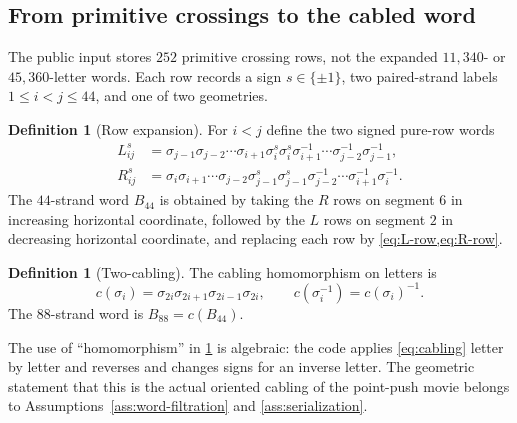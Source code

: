 \documentclass[10pt,reqno]{amsart}
\theoremstyle{definition}
\newtheorem{definition}[theorem]{Definition}
\theoremstyle{remark}
\begin{document}
\subsection{From primitive crossings to the cabled word}

The public input stores $252$ primitive crossing rows, not the expanded
$11{,}340$- or $45{,}360$-letter words.  Each row records a sign
$s\in\{\pm1\}$, two paired-strand labels $1\le i<j\le44$, and one of two geometries.

\begin{definition}[Row expansion]\label{def:row-expansion}
For $i<j$ define the two signed pure-row words
\begin{align}
L_{ij}^{s}
 &=\sigma_{j-1}\sigma_{j-2}\cdots\sigma_{i+1}
   \sigma_i^{s}\sigma_i^{s}
   \sigma_{i+1}^{-1}\cdots\sigma_{j-2}^{-1}\sigma_{j-1}^{-1},
   \label{eq:L-row}\\
R_{ij}^{s}
 &=\sigma_i\sigma_{i+1}\cdots\sigma_{j-2}
   \sigma_{j-1}^{s}\sigma_{j-1}^{s}
   \sigma_{j-2}^{-1}\cdots\sigma_{i+1}^{-1}\sigma_i^{-1}.
   \label{eq:R-row}
\end{align}
The $44$-strand word $B_{44}$ is obtained by taking the $R$ rows on segment
$6$ in increasing horizontal coordinate, followed by the $L$ rows on segment
$2$ in decreasing horizontal coordinate, and replacing each row by
\cref{eq:L-row,eq:R-row}.
\end{definition}

\begin{definition}[Two-cabling]\label{def:cabling}
The cabling homomorphism on letters is
\begin{equation}\label{eq:cabling}
c(\sigma_i)=\sigma_{2i}\sigma_{2i+1}\sigma_{2i-1}\sigma_{2i},
\qquad
c(\sigma_i^{-1})=c(\sigma_i)^{-1}.
\end{equation}
The $88$-strand word is $B_{88}=c(B_{44})$.
\end{definition}

The use of ``homomorphism'' in \cref{def:cabling} is algebraic: the code
applies \cref{eq:cabling} letter by letter and reverses and changes signs for
an inverse letter.  The geometric statement that this is the actual oriented
cabling of the point-push movie belongs to
Assumptions~\ref{ass:word-filtration} and \ref{ass:serialization}.
\end{document}
